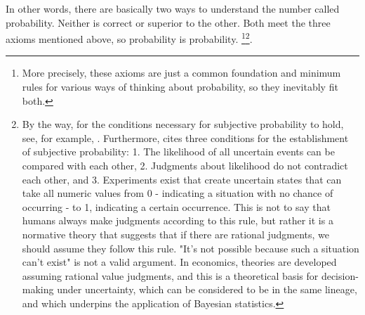 \documentclass{ltjsbook}
\begin{document}
In other words, there are basically two ways to understand the number called probability. Neither is correct or superior to the other. Both meet the three axioms mentioned above, so probability is probability. \footnote{More precisely, these axioms are just a common foundation and minimum rules for various ways of thinking about probability, so they inevitably fit both.}\footnote{By the way, for the conditions necessary for subjective probability to hold, see, for example, \textcite{Gilboa2014}. Furthermore, \textcite{shigemasu2019} cites three conditions for the establishment of subjective probability: 1. The likelihood of all uncertain events can be compared with each other, 2. Judgments about likelihood do not contradict each other, and 3. Experiments exist that create uncertain states that can take all numeric values from 0 - indicating a situation with no chance of occurring - to 1, indicating a certain occurrence. This is not to say that humans always make judgments according to this rule, but rather it is a normative theory that suggests that if there are rational judgments, we should assume they follow this rule. "It's not possible because such a situation can't exist" is not a valid argument. In economics, theories are developed assuming rational value judgments, and this is a theoretical basis for decision-making under uncertainty, which can be considered to be in the same lineage, and which underpins the application of Bayesian statistics.}.
\end{document}
